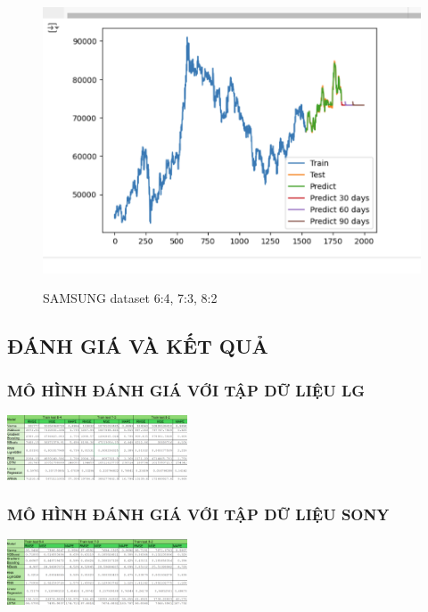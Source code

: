 \documentclass[conference]{IEEEtran}
\begin{document}
\begin{figure}[H]
\begin{minipage}{0.15\textwidth}
    \label{fig:2}
    \end{minipage}%
    \begin{minipage}{0.15\textwidth}
    \centering
    \includegraphics[width=1\textwidth]{Image/Light GBM/LightGBM_SS_8_2.png}

    \label{fig:3}
    \end{minipage}
    \caption{SAMSUNG dataset  6:4, 7:3, 8:2  }
\end{figure}


\subsection{ĐÁNH GIÁ VÀ KẾT QUẢ }
\subsubsection{MÔ HÌNH ĐÁNH GIÁ VỚI TẬP DỮ LIỆU LG }
\includegraphics[width=0.4\textwidth]{Image/ket qua/LG_metrics.png}
\subsubsection{MÔ HÌNH ĐÁNH GIÁ VỚI TẬP DỮ LIỆU SONY}
\includegraphics[width=0.4\textwidth]{Image/ket qua/SONY_metrics.png}
\end{document}
